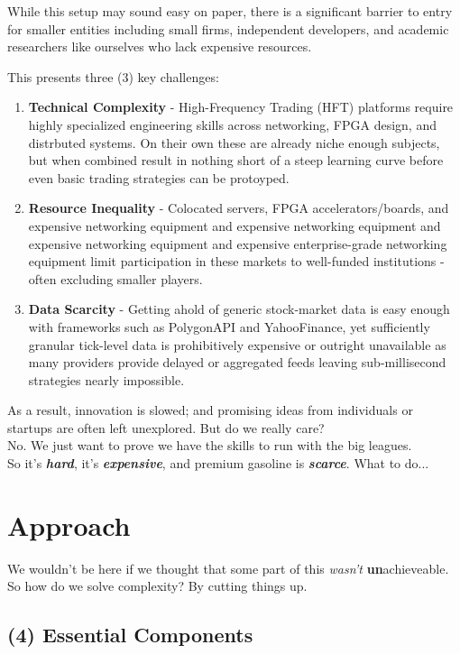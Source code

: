 \documentclass[12pt]{article}
\begin{document}
While this setup may sound easy on paper, there is a significant barrier to entry for smaller entities including small firms, independent developers, and academic researchers like ourselves who lack expensive resources.

This presents three (3) key challenges: 
\begin{enumerate}
  \item \textbf{Technical Complexity} - High-Frequency Trading (HFT) platforms require highly specialized engineering skills across networking, FPGA design, and distrbuted systems. On their own these are already niche enough subjects, but when combined result in nothing short of a steep learning curve before even basic trading strategies can be protoyped.
  \item \textbf{Resource Inequality} - Colocated servers, FPGA accelerators/boards, and expensive networking equipment  and expensive networking equipment  and expensive networking equipment  and expensive enterprise-grade networking equipment limit participation in these markets to well-funded institutions - often excluding smaller players.
  \item \textbf{Data Scarcity} - Getting ahold of generic stock-market data is easy enough with frameworks such as PolygonAPI and YahooFinance, yet sufficiently granular tick-level data is prohibitively expensive or outright unavailable as many providers provide delayed or aggregated feeds leaving sub-millisecond strategies nearly impossible. 
\end{enumerate}

As a result, innovation is slowed; and promising ideas from individuals or startups are often left unexplored.
But do we really care? \\ No. We just want to prove we have the skills to run with the big leagues.
\\
So it's \textbf{\emph{hard}}, it's \textbf{\emph{expensive}}, and premium gasoline is \textbf{\emph{scarce}}. What to do...
\clearpage


\section*{Approach}
We wouldn't be here if we thought that some part of this \emph{wasn't} \textbf{un}achieveable. So how do we solve complexity? By cutting things up.
\subsection*{(4) Essential Components}
\end{document}

